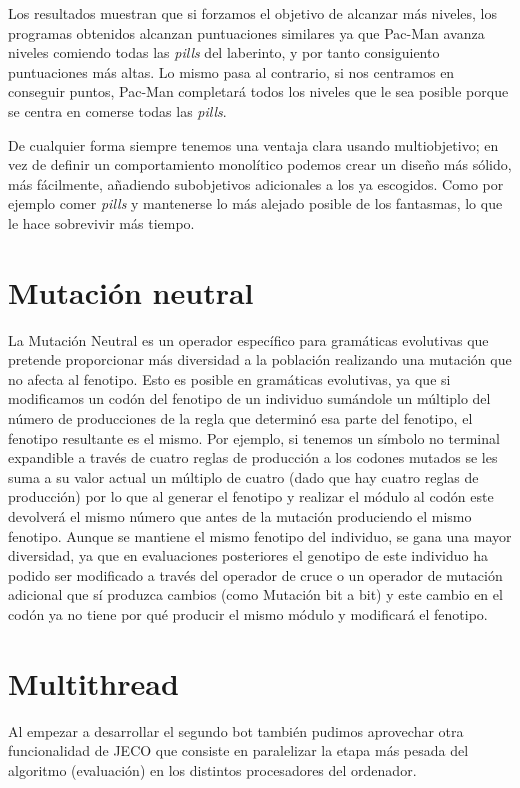 Los resultados muestran que si forzamos el objetivo de alcanzar más niveles, los programas obtenidos alcanzan puntuaciones similares ya que Pac-Man avanza niveles comiendo todas las \textit{pills} del laberinto, y por tanto consiguiento puntuaciones más altas. Lo mismo pasa al contrario, si nos centramos en conseguir puntos, Pac-Man completará todos los niveles que le sea posible porque se centra en comerse todas las \textit{pills}.
 
De cualquier forma siempre tenemos una ventaja clara usando multiobjetivo; en vez de definir un comportamiento monolítico podemos crear un diseño más sólido, más fácilmente, añadiendo subobjetivos adicionales a los ya escogidos. Como por ejemplo comer \textit{pills} y mantenerse lo más alejado posible de los fantasmas, lo que le hace sobrevivir más tiempo.

\section{Mutación neutral}
La Mutación Neutral es un operador específico para gramáticas evolutivas\cite{oesch2015neutral} que pretende proporcionar más diversidad a la población realizando una mutación que no afecta al fenotipo. Esto es posible en gramáticas evolutivas, ya que si modificamos un codón del fenotipo de un individuo sumándole un múltiplo del número de producciones de la regla que determinó esa parte del fenotipo, el fenotipo resultante es el mismo. Por ejemplo, si tenemos un símbolo no terminal expandible a través de cuatro reglas de producción a los codones mutados se les suma a su valor actual un múltiplo de cuatro (dado que hay cuatro reglas de producción) por lo que al generar el fenotipo y realizar el módulo al codón este devolverá el mismo número que antes de la mutación produciendo el mismo fenotipo.
Aunque se mantiene el mismo fenotipo del individuo, se gana una mayor diversidad, ya que en evaluaciones posteriores el genotipo de este individuo ha podido ser modificado a través del operador de cruce o un operador de mutación adicional que sí produzca cambios (como Mutación bit a bit) y este cambio en el codón ya no tiene por qué producir el mismo módulo y modificará el fenotipo.


\section{Multithread}
Al empezar a desarrollar el segundo bot también pudimos aprovechar otra funcionalidad de JECO que consiste en paralelizar la etapa más pesada del algoritmo (evaluación) en los distintos procesadores del ordenador.


